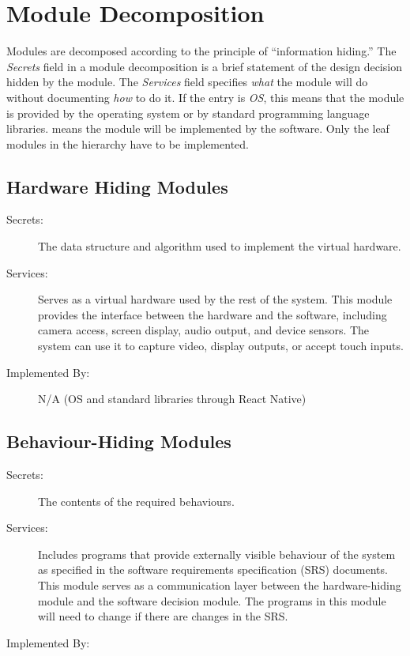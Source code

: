 \documentclass[12pt, titlepage]{article}
\begin{document}
\section{Module Decomposition} \label{SecMD}

Modules are decomposed according to the principle of ``information hiding.'' The \emph{Secrets} field in a module decomposition is a brief statement of the design decision hidden by the module. The \emph{Services} field specifies \emph{what} the module will do without documenting \emph{how} to do it. If the entry is \emph{OS}, this means that the module is provided by the operating system or by standard programming language libraries. \emph{\progname{}} means the module will be implemented by the \progname{} software. Only the leaf modules in the hierarchy have to be implemented.

\subsection{Hardware Hiding Modules}

\begin{description}
	\item[Secrets:] The data structure and algorithm used to implement the virtual hardware.
	\item[Services:] Serves as a virtual hardware used by the rest of the system. This module provides the interface between the hardware and the software, including camera access, screen display, audio output, and device sensors. The system can use it to capture video, display outputs, or accept touch inputs.
	\item[Implemented By:] N/A (OS and standard libraries through React Native)
\end{description}

\subsection{Behaviour-Hiding Modules}

\begin{description}
	\item[Secrets:] The contents of the required behaviours.
	\item[Services:] Includes programs that provide externally visible behaviour of the system as specified in the software requirements specification (SRS) documents. This module serves as a communication layer between the hardware-hiding module and the software decision module. The programs in this module will need to change if there are changes in the SRS.
	\item[Implemented By:] \progname{}
\end{description}
\end{document}
